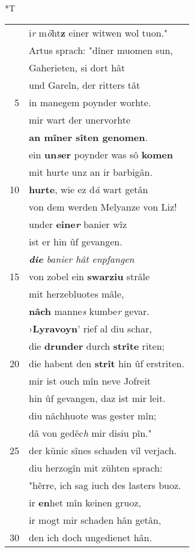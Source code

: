 \documentclass[8pt,a4paper,notitlepage]{article}
\begin{document}
\begin{table}[ht]
\begin{minipage}[t]{0.5\linewidth}
\small
\begin{center}*T
\end{center}
\begin{tabular}{rl}
 & i\textit{r} m\textit{ö}ht\textbf{z} einer witwen wol tuon."\\ 
 & Artus sprach: "dîner muomen sun,\\ 
 & Gaherieten, si dort hât\\ 
 & und Gareln, der ritters tât\\ 
5 & in manegem poynder worhte.\\ 
 & mir wart der unervorhte\\ 
 & \textbf{an mîner sîten genomen}.\\ 
 & ein \textbf{un\textit{s}er} poynder was sô \textbf{komen}\\ 
 & mit hurte unz an ir barbigân.\\ 
10 & \textbf{hurte}, wie ez d\textit{â} wart getân\\ 
 & von dem werden Melyanze von Liz!\\ 
 & under \textbf{eine\textit{r}} banier wîz\\ 
 & ist er hin ûf gevangen.\\ 
 & \textit{\textbf{die} banier hât enpfangen}\\ 
15 & von zobel ein \textbf{swarziu} strâle\\ 
 & mit herzebluotes mâle,\\ 
 & \textbf{nâch} manne\textit{s} kumbe\textit{r} gevar.\\ 
 & ›\textbf{Lyravoyn}' rief al diu schar,\\ 
 & die \textbf{drunder} durch \textbf{strîte} riten;\\ 
20 & die habent den \textbf{strît} hin ûf erstriten.\\ 
 & mir ist ouch mîn neve Jofreit\\ 
 & hin ûf gevangen, daz ist mir leit.\\ 
 & diu nâchhuote was gester mîn;\\ 
 & dâ von gedêc\textit{h} mir disiu pîn."\\ 
25 & der künic sînes schaden vil verjach.\\ 
 & diu herzogîn mit zühten sprach:\\ 
 & "hêrre, ich sag iuch des lasters buoz.\\ 
 & ir \textbf{en}het mîn keinen gruoz,\\ 
 & ir mogt mir schaden hân getân,\\ 
30 & den ich doch ungedienet hân.\\ 

\end{tabular}
\end{minipage}
\end{table}
\end{document}

